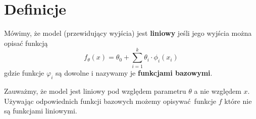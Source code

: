 \section{Definicje}

\begin{definition}
Mówimy, że model (przewidujący wyjścia) jest \textbf{liniowy} jeśli jego wyjścia można opisać funkcją
\[
    f_\theta(x) = \theta_0 + \sum_{i=1}^k \theta_i \cdot \phi_i(x_i)
\]
gdzie funkcje \( \varphi_i \) są dowolne i nazywamy je \textbf{funkcjami bazowymi}.
\end{definition}

Zauważmy, że model jest liniowy pod względem parametru \( \theta \) a nie względem \( x \). Używając odpowiednich funkcji bazowych możemy opisywać funkcje \( f \) które nie są funkcjami liniowymi.
